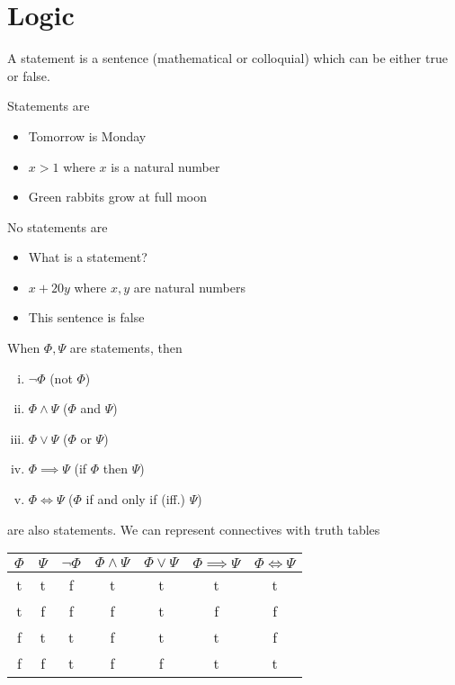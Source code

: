 \documentclass[../../script.tex]{subfiles}
\begin{document}
\section{Logic}
\begin{defi}[Statements]
A statement is a sentence (mathematical or colloquial) which can be either true or false.
\end{defi}

\begin{eg}
Statements are
\begin{itemize}
	\item Tomorrow is Monday
	\item $x > 1$ where $x$ is a natural number
	\item Green rabbits grow at full moon
\end{itemize}
No statements are
\begin{itemize}
	\item What is a statement?
	\item $x + 20y$ where $x, y$ are natural numbers
	\item This sentence is false
\end{itemize}
\end{eg}

\begin{defi}[Connectives]
When $\Phi, \Psi$ are statements, then
\begin{enumerate}[(i)]
	\item $\neg\Phi$ (not $\Phi$)
	\item $\Phi \wedge \Psi$ ($\Phi$ and $\Psi$)
	\item $\Phi \vee \Psi$ ($\Phi$ or $\Psi$)
	\item $\Phi \implies \Psi$ (if $\Phi$ then $\Psi$)
	\item $\Phi \iff \Psi$ ($\Phi$ if and only if (iff.) $\Psi$)
\end{enumerate}
are also statements. We can represent connectives with truth tables
\begin{center}
\begin{tabular}{ c|c||c|c|c|c|c }
 $\Phi$ & $\Psi$ & $\neg\Phi$ & $\Phi \wedge \Psi$ & $\Phi \vee \Psi$ & $\Phi \implies \Psi$ & $\Phi \iff \Psi$ \\
 \hline
 t & t & f & t & t & t & t\\
 t & f & f & f & t & f & f\\
 f & t & t & f & t & t & f\\
 f & f & t & f & f & t & t\\
\end{tabular}
\end{center}
\end{defi}
\end{document}
